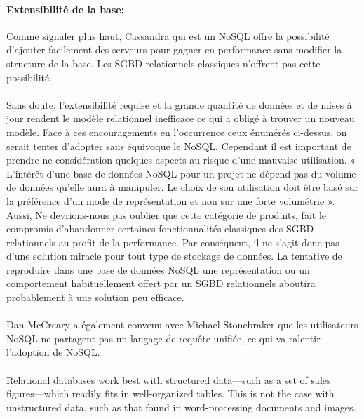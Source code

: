 \paragraph{Extensibilité de la base:} Comme signaler plus haut, 
\textsf{Cassandra} qui est un \textsf{NoSQL} offre la possibilité 
d'ajouter facilement des serveurs pour gagner en performance sans modifier 
la structure de la base. Les \textsf{SGBD} relationnels classiques 
n'offrent pas cette possibilité.
\\ 
\\ 
Sans doute, l'extensibilité requise et la grande quantité de données
et de mises à jour rendent le modèle relationnel inefficace ce qui a
obligé à trouver un nouveau modèle.  Face à ces encouragements en
l'occurrence ceux énumérés ci-dessus, on serait tenter d'adopter sans
équivoque le \textsf{NoSQL}. Cependant il est important de prendre ne
considération quelques aspects au risque d'une mauvaise utilisation. «
L’intérêt d’une base de données \textsf{NoSQL} pour un projet ne
dépend pas du volume de données qu’elle aura à manipuler. Le choix de
son utilisation doit être basé sur la préférence d’un mode de
représentation et non sur une forte volumétrie
»\cite{NoSQLeurope}. Aussi, Ne devrions-nous pas oublier que cette
catégorie de produits, fait le compromis d'abandonner certaines
fonctionnalités classiques des \textsf{SGBD} relationnels au profit de
la performance. Par conséquent, il ne s’agit donc pas d’une solution
miracle pour tout type de stockage de données.  La tentative de
reproduire dans une base de données \textsf{NoSQL} une représentation
ou un comportement habituellement offert par un \textsf{SGBD}
relationnels aboutira probablement à une solution peu efficace.
\\
\\
Dan McCreary a également convenu avec Michael Stonebraker que les
utilisateurs NoSQL ne partagent pas un langage de requête unifiée, ce
qui va ralentir l'adoption de NoSQL\cite{SergeLeblal}.
\\
\\
Relational databases work best with structured data—such as a set of
sales figures—which readily fits in well-organized tables. This is not
the case with unstructured data, such as that found in word-processing
documents and images\cite{NealLeavitt}.

